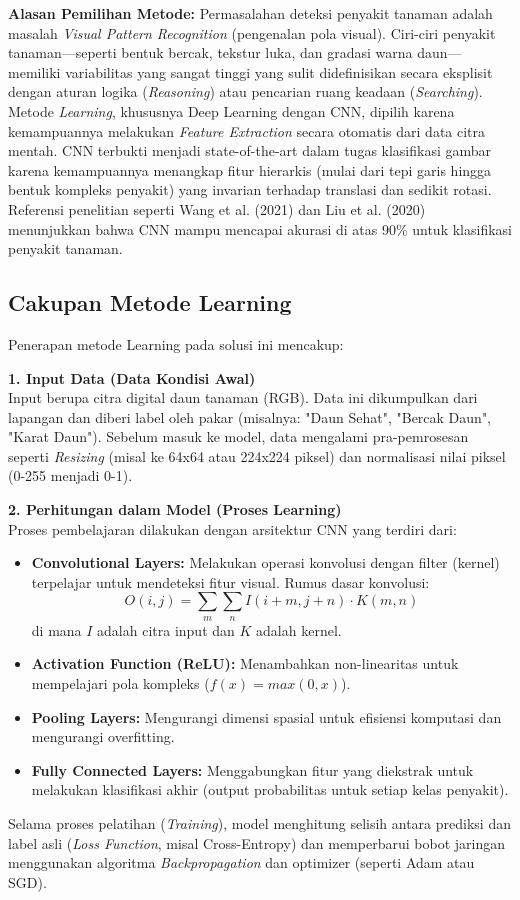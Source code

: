 \documentclass[a4paper,12pt]{article}
\begin{document}
\textbf{Alasan Pemilihan Metode:}
Permasalahan deteksi penyakit tanaman adalah masalah \textit{Visual Pattern Recognition} (pengenalan pola visual). Ciri-ciri penyakit tanaman—seperti bentuk bercak, tekstur luka, dan gradasi warna daun—memiliki variabilitas yang sangat tinggi yang sulit didefinisikan secara eksplisit dengan aturan logika (\textit{Reasoning}) atau pencarian ruang keadaan (\textit{Searching}).
Metode \textit{Learning}, khususnya Deep Learning dengan CNN, dipilih karena kemampuannya melakukan \textit{Feature Extraction} secara otomatis dari data citra mentah. CNN terbukti menjadi state-of-the-art dalam tugas klasifikasi gambar karena kemampuannya menangkap fitur hierarkis (mulai dari tepi garis hingga bentuk kompleks penyakit) yang invarian terhadap translasi dan sedikit rotasi. Referensi penelitian seperti Wang et al. (2021) dan Liu et al. (2020) menunjukkan bahwa CNN mampu mencapai akurasi di atas 90\% untuk klasifikasi penyakit tanaman.

\subsection{Cakupan Metode Learning}
Penerapan metode Learning pada solusi ini mencakup:

\textbf{1. Input Data (Data Kondisi Awal)} \\
Input berupa citra digital daun tanaman (RGB). Data ini dikumpulkan dari lapangan dan diberi label oleh pakar (misalnya: "Daun Sehat", "Bercak Daun", "Karat Daun"). Sebelum masuk ke model, data mengalami pra-pemrosesan seperti \textit{Resizing} (misal ke 64x64 atau 224x224 piksel) dan normalisasi nilai piksel (0-255 menjadi 0-1).

\textbf{2. Perhitungan dalam Model (Proses Learning)} \\
Proses pembelajaran dilakukan dengan arsitektur CNN yang terdiri dari:
\begin{itemize}
    \item \textbf{Convolutional Layers:} Melakukan operasi konvolusi dengan filter (kernel) terpelajar untuk mendeteksi fitur visual. Rumus dasar konvolusi:
    \[ O(i,j) = \sum_{m}\sum_{n} I(i+m, j+n) \cdot K(m,n) \]
    di mana $I$ adalah citra input dan $K$ adalah kernel.
    \item \textbf{Activation Function (ReLU):} Menambahkan non-linearitas untuk mempelajari pola kompleks ($f(x) = max(0, x)$).
    \item \textbf{Pooling Layers:} Mengurangi dimensi spasial untuk efisiensi komputasi dan mengurangi overfitting.
    \item \textbf{Fully Connected Layers:} Menggabungkan fitur yang diekstrak untuk melakukan klasifikasi akhir (output probabilitas untuk setiap kelas penyakit).
\end{itemize}
Selama proses pelatihan (\textit{Training}), model menghitung selisih antara prediksi dan label asli (\textit{Loss Function}, misal Cross-Entropy) dan memperbarui bobot jaringan menggunakan algoritma \textit{Backpropagation} dan optimizer (seperti Adam atau SGD).
\end{document}
